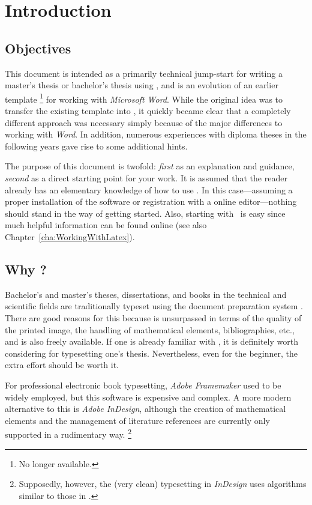 \chapter{Introduction}
\label{cha:Introduction}


\section{Objectives}

This document is intended as a primarily technical jump-start for writing a
master's thesis or bachelor's thesis using \latex, and is an evolution of an
earlier template%
\footnote{No longer available.}
for working with \emph{Microsoft Word}. While the original idea was to transfer
the existing template into \latex, it quickly became clear that a completely
different approach was necessary simply because of the major differences to
working with \emph{Word}. In addition, numerous experiences with diploma theses
in the following years gave rise to some additional hints.

The purpose of this document is twofold: \emph{first} as an explanation and
guidance, \emph{second} as a direct starting point for your work. It is assumed
that the reader already has an elementary knowledge of how to use \latex. In
this case---assuming a proper installation of the software or registration with
a \latex online editor---nothing should stand in the way of getting started.
Also, starting with \latex\ is easy since much helpful information can be
found online (see also Chapter~\ref{cha:WorkingWithLatex}).


\section{Why {\latex}?}

Bachelor's and master's theses, dissertations, and books in the technical and
scientific fields are traditionally typeset using the document preparation
system \latex \cite{Lamport1994, Lamport1995}. There are good reasons for this
because \latex is unsurpassed in terms of the quality of the printed image, the
handling of mathematical elements, bibliographies, etc., and is also freely
available. If one is already familiar with \latex, it is definitely worth
considering for typesetting one's thesis. Nevertheless, even for the beginner,
the extra effort should be worth it.

For professional electronic book typesetting, \emph{Adobe Framemaker} used to be
widely employed, but this software is expensive and complex. A more modern
alternative to this is \emph{Adobe InDesign}, although the creation of
mathematical elements and the management of literature references are currently
only supported in a rudimentary way.%
\footnote{Supposedly, however, the (very clean) typesetting in \emph{InDesign}
uses algorithms similar to those in \latex.}

